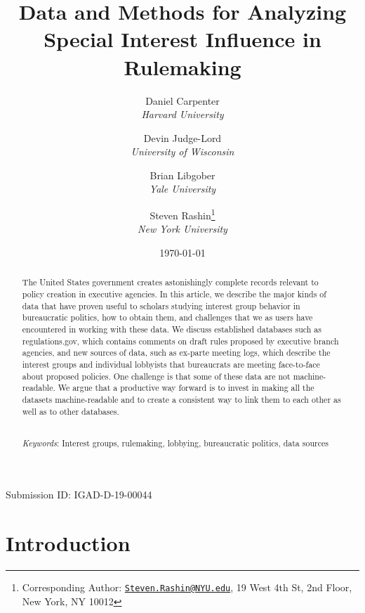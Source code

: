 \documentclass[
      12pt,
        ]{article}
\title{Data and Methods for Analyzing Special Interest Influence in Rulemaking}
\author{ %
            Daniel Carpenter  \\ \emph{Harvard University} 
             \and 
            Devin Judge-Lord  \\ \emph{University of Wisconsin} 
             \and 
            Brian Libgober  \\ \emph{Yale University} 
             \and 
            Steven Rashin\footnote{Corresponding Author:
\href{mailto:Steven.Rashin@NYU.edu}{\nolinkurl{Steven.Rashin@NYU.edu}},
19 West 4th St, 2nd Floor, New York, NY 10012}  \\ \emph{New York University} 
            }
\date{\today}
\begin{document}
 


  \maketitle




  \begin{abstract}
    \noindent The United States government creates astonishingly complete records
relevant to policy creation in executive agencies. In this article, we
describe the major kinds of data that have proven useful to scholars
studying interest group behavior in bureaucratic politics, how to obtain
them, and challenges that we as users have encountered in working with
these data. We discuss established databases such as regulations.gov,
which contains comments on draft rules proposed by executive branch
agencies, and new sources of data, such as ex-parte meeting logs, which
describe the interest groups and individual lobbyists that bureaucrats
are meeting face-to-face about proposed policies. One challenge is that
some of these data are not machine-readable. We argue that a productive
way forward is to invest in making all the datasets machine-readable and
to create a consistent way to link them to each other as well as to
other databases. 

          \hfill \\ 
      \noindent \emph{Keywords}: Interest groups, rulemaking, lobbying, bureaucratic politics, data
sources 
    
  \end{abstract}









  \newpage

\noindent 
      \doublespacing 
    \noindent Submission ID: IGAD-D-19-00044

\hypertarget{introduction}{%
\section{Introduction}\label{introduction}}
\end{document}
